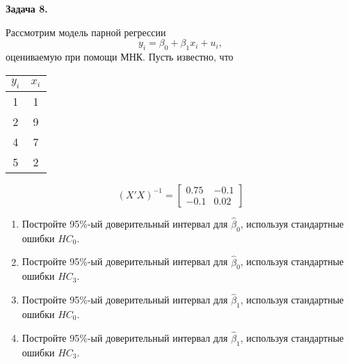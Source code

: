\documentclass[10pt, a4paper]{extarticle}
\begin{document}
	{\Large \textbf{Задача 8.}}
	
	Рассмотрим модель парной регрессии
	\[
	y_i = \beta_0 + \beta_1x_i + u_i,
	\]
	оцениваемую при помощи МНК. Пусть известно, что 
	
	\begin{center}
	\begin{tabular}{c|c}
		$y_i$ & $x_i$ \\
		\hline
		1 & 1 \\
		2 & 9 \\
		4 & 7 \\
		5 & 2
	\end{tabular}
	\end{center}
	\[
	(X'X)^{-1} = \begin{bmatrix}
		0.75 & -0.1 \\
		-0.1 &  0.02
	\end{bmatrix}
	\]

	\begin{enumerate}[label = \alph*)]		
		\item Постройте 95\%-ый доверительный интервал для $\hat{\beta}_0$, используя стандартные ошибки $HC_0$.
		\item Постройте 95\%-ый доверительный интервал для $\hat{\beta}_0$, используя стандартные ошибки $HC_3$.
		\item Постройте 95\%-ый доверительный интервал для $\hat{\beta}_1$, используя стандартные ошибки $HC_0$.
		\item Постройте 95\%-ый доверительный интервал для $\hat{\beta}_1$, используя стандартные ошибки $HC_3$.
	\end{enumerate}
	
\end{document}
